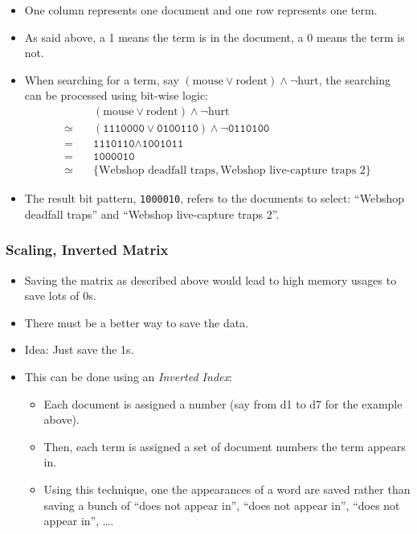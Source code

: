 			\begin{itemize}
				\item One column represents one document and one row represents one term.
				\item As said above, a 1 means the term is in the document, a 0 means the term is not.
				\item When searching for a term, say \( (\text{mouse} \lor \text{rodent}) \land \lnot\text{hurt} \), the searching can be processed using bit-wise logic:
					\begin{align*}
						       & \quad (\text{mouse} \lor \text{rodent}) \land \lnot\text{hurt}                 \\
						\simeq & \quad (\texttt{1110000} \lor \texttt{0100110}) \land \lnot\texttt{0110100}     \\
						=      & \quad \texttt{1110110} \land \texttt{1001011}                                  \\
						=      & \quad \texttt{1000010}                                                         \\
						\simeq & \quad \{ \text{Webshop deadfall traps}, \text{Webshop live-capture traps 2} \}
					\end{align*}
				\item The result bit pattern, \texttt{1000010}, refers to the documents to select: \enquote{Webshop deadfall traps} and \enquote{Webshop live-capture traps 2}.
			\end{itemize}

			\subsubsection{Scaling, Inverted Matrix} %
				\begin{itemize}
					\item Saving the matrix as described above would lead to high memory usages to save lots of 0s.
					\item There must be a better way to save the data.
					\item Idea: Just save the 1s.
					\item This can be done using an \textit{Inverted Index}:
						\begin{itemize}
							\item Each document is assigned a number (say from d1 to d7 for the example above).
							\item Then, each term is assigned a set of document numbers the term appears in.
							\item Using this technique, one the appearances of a word are saved rather than saving a bunch of \enquote{does not appear in}, \enquote{does not appear in}, \enquote{does not appear in}, \dots.
						\end{itemize}
				\end{itemize}

